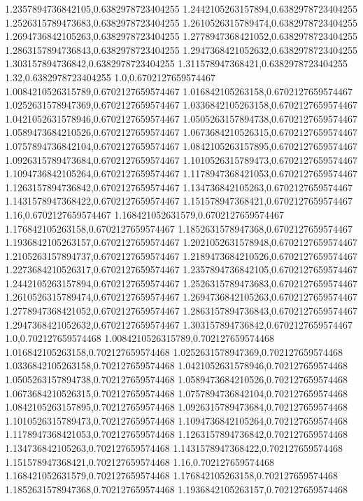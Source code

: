 1.2357894736842105,0.6382978723404255
1.2442105263157894,0.6382978723404255
1.2526315789473683,0.6382978723404255
1.2610526315789474,0.6382978723404255
1.2694736842105263,0.6382978723404255
1.2778947368421052,0.6382978723404255
1.2863157894736843,0.6382978723404255
1.2947368421052632,0.6382978723404255
1.303157894736842,0.6382978723404255
1.311578947368421,0.6382978723404255
1.32,0.6382978723404255
1.0,0.6702127659574467
1.0084210526315789,0.6702127659574467
1.016842105263158,0.6702127659574467
1.0252631578947369,0.6702127659574467
1.0336842105263158,0.6702127659574467
1.0421052631578946,0.6702127659574467
1.0505263157894738,0.6702127659574467
1.0589473684210526,0.6702127659574467
1.0673684210526315,0.6702127659574467
1.0757894736842104,0.6702127659574467
1.0842105263157895,0.6702127659574467
1.0926315789473684,0.6702127659574467
1.1010526315789473,0.6702127659574467
1.1094736842105264,0.6702127659574467
1.1178947368421053,0.6702127659574467
1.1263157894736842,0.6702127659574467
1.134736842105263,0.6702127659574467
1.1431578947368422,0.6702127659574467
1.151578947368421,0.6702127659574467
1.16,0.6702127659574467
1.168421052631579,0.6702127659574467
1.176842105263158,0.6702127659574467
1.1852631578947368,0.6702127659574467
1.1936842105263157,0.6702127659574467
1.2021052631578948,0.6702127659574467
1.2105263157894737,0.6702127659574467
1.2189473684210526,0.6702127659574467
1.2273684210526317,0.6702127659574467
1.2357894736842105,0.6702127659574467
1.2442105263157894,0.6702127659574467
1.2526315789473683,0.6702127659574467
1.2610526315789474,0.6702127659574467
1.2694736842105263,0.6702127659574467
1.2778947368421052,0.6702127659574467
1.2863157894736843,0.6702127659574467
1.2947368421052632,0.6702127659574467
1.303157894736842,0.6702127659574467
1.0,0.702127659574468
1.0084210526315789,0.702127659574468
1.016842105263158,0.702127659574468
1.0252631578947369,0.702127659574468
1.0336842105263158,0.702127659574468
1.0421052631578946,0.702127659574468
1.0505263157894738,0.702127659574468
1.0589473684210526,0.702127659574468
1.0673684210526315,0.702127659574468
1.0757894736842104,0.702127659574468
1.0842105263157895,0.702127659574468
1.0926315789473684,0.702127659574468
1.1010526315789473,0.702127659574468
1.1094736842105264,0.702127659574468
1.1178947368421053,0.702127659574468
1.1263157894736842,0.702127659574468
1.134736842105263,0.702127659574468
1.1431578947368422,0.702127659574468
1.151578947368421,0.702127659574468
1.16,0.702127659574468
1.168421052631579,0.702127659574468
1.176842105263158,0.702127659574468
1.1852631578947368,0.702127659574468
1.1936842105263157,0.702127659574468
